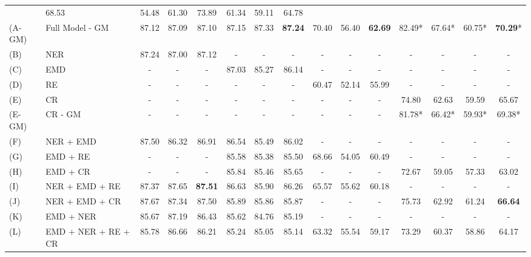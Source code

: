\documentclass[letterpaper]{article} %
\begin{document}
\begin{table}
{\begin{tabular}{|l l|| c|c|c || c|c|c || c|c|c || c|c|c|c |}
                & 68.53 & 54.48 & 61.30
                & 73.89 & 61.34 & 59.11 & 64.78 \\
        (A-GM) & Full Model - GM
                & 87.12 & 87.09 & 87.10
                & 87.15 & 87.33 & \textbf{87.24}
                & 70.40 & 56.40 & \textbf{62.69}
                & 82.49* & 67.64* & 60.75* & \textbf{70.29}* \\
       \hline
       (B) & NER
            & 87.24 & 87.00 & 87.12
            & - & - & -
            & - & - & -
            & - & - & - & - \\
        (C) & EMD
            & - & - & -
            & 87.03 & 85.27 & 86.14
            & - & - & -
            & - & - & - & - \\
        (D) & RE
            & - & - & -
            & - & - & -
            & 60.47 & 52.14 & 55.99
            & - & - & - & - \\
        (E) & CR
            & - & - & -
            & - & - & -
            & - & - & -
            & 74.80 & 62.63 & 59.59 & 65.67 \\
        (E-GM) & CR - GM
            & - & - & -
            & - & - & -
            & - & - & -
            & 81.78* & 66.42* & 59.93* & 69.38* \\
        \hline
        (F) & NER + EMD
            & 87.50 & 86.32 & 86.91
            & 86.54 & 85.49 & 86.02
            & - & - & -
            & - & - & - & - \\
        (G) & EMD + RE
            & - & - & -
            & 85.58 & 85.38 & 85.50
            & 68.66 & 54.05 & 60.49
            & - & - & - & - \\
        (H) & EMD + CR
            & - & - & -
            & 85.84 & 85.46 & 85.65
            & - & - & -
            & 72.67 & 59.05 & 57.33 & 63.02 \\
        \hline
        (I) & NER + EMD + RE
            & 87.37 & 87.65 & \textbf{87.51}
            & 86.63 & 85.90 & 86.26
            & 65.57 & 55.62 & 60.18
            & - & - & - & - \\
        (J) & NER + EMD + CR
            & 87.67 & 87.34 & 87.50
            & 85.89 & 85.86 & 85.87
            & - & - & -
            & 75.73 & 62.92 & 61.24 & \textbf{66.64} \\
        \hline
        (K) & EMD + NER
            & 85.67 & 87.19 & 86.43
            & 85.62 & 84.76 & 85.19
            & - & - & -
            & - & - & - & - \\
        (L) & EMD + NER + RE + CR
            & 85.78 & 86.66 & 86.21
            & 85.24 & 85.05 & 85.14
            & 63.32 & 55.54 & 59.17
            & 73.29 & 60.37 & 58.86 & 64.17 \\
        \hline
    \end{tabular}%
}
\end{table}
\end{document}
